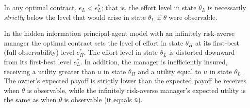 \begin{lem}
    In any optimal contract, $e_L < e^*_L$; that is, the effort level in state $\theta_L$ is necessarily \emph{strictly} below the level that would arise in state $\theta_L$ if $\theta$ were observable.
\end{lem}

\begin{prop}
    In the hidden information principal-agent model with an infinitely risk-averse manager the optimal contract sets the level of effort in state $\theta_H$ at its first-best (full observability) level $e^*_H$. The effort level in state $\theta_L$ is distorted downward from its first-best level $e^*_L$. In addition, the manager is inefficiently insured, receiving a utility greater than $\bar{u}$ in state $\theta_H$ and a utility equal to $\bar{u}$ in state $\theta_L$. The owner's expected payoff is strictly lower than the expected payoff he receives when $\theta$ is observable, while the infinitely risk-averse manager's expected utility is the same as when $\theta$ is observable (it equals $\bar{u}$).
\end{prop}
